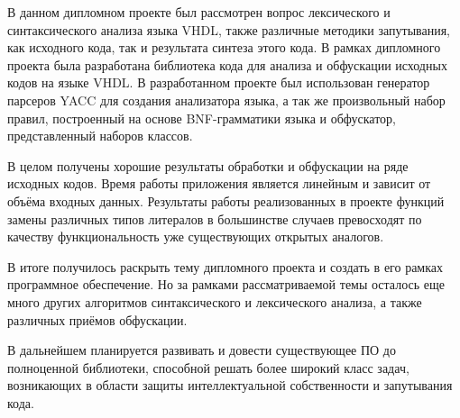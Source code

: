 
В данном дипломном проекте был рассмотрен вопрос лексического и синтаксического анализа языка VHDL, также различные методики запутывания, как исходного кода, так и результата синтеза этого кода. В рамках дипломного проекта была разработана библиотека кода для анализа и обфускации исходных кодов на языке VHDL.
В разработанном проекте был использован генератор парсеров YACC для создания анализатора языка, а так же произвольный набор правил, построенный на основе BNF-грамматики языка и обфускатор, представленный наборов классов.

В целом получены хорошие результаты обработки и обфускации на ряде исходных кодов. Время работы приложения является линейным и зависит от объёма входных данных. Результаты работы реализованных в проекте функций замены различных типов литералов в большинстве случаев превосходят по качеству функциональность уже существующих открытых аналогов.

В итоге получилось раскрыть тему дипломного проекта и создать в его рамках программное обеспечение.
Но за рамками рассматриваемой темы осталось еще много других алгоритмов синтаксического и лексического анализа, а также различных приёмов обфускации.

В дальнейшем планируется развивать и довести существующее ПО до полноценной библиотеки, способной решать более широкий класс задач, возникающих в области защиты интеллектуальной собственности и запутывания кода.